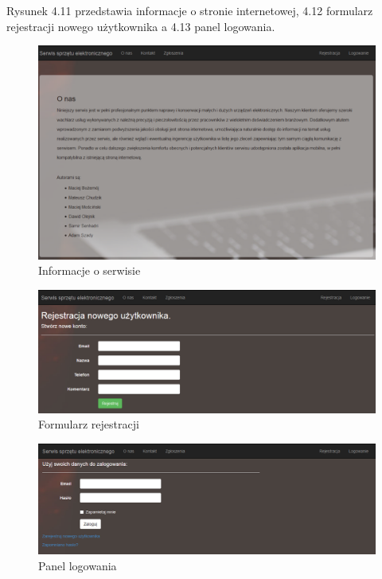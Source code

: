 \documentclass[a4paper,11pt]{article}
\begin{document}
Rysunek 4.11 przedstawia informacje o stronie internetowej, 4.12 formularz rejestracji nowego użytkownika a 4.13 panel logowania.
\begin{figure}[h!]
	\centering
	\includegraphics[width=\textwidth,height=0.6\textheight]{serwisOnas.png}
	\caption{Informacje o serwisie}
\end{figure}
\begin{figure}[h!]
	\centering
	\includegraphics[width=\textwidth,height=0.4\textheight]{serwisRejestracja.png}
	\caption{Formularz rejestracji}
\end{figure}
\begin{figure}[h!]
	\centering
	\includegraphics[width=\textwidth,height=0.3\textheight]{serwisLogowanie.png}
	\caption{Panel logowania}
\end{figure}
\end{document}

